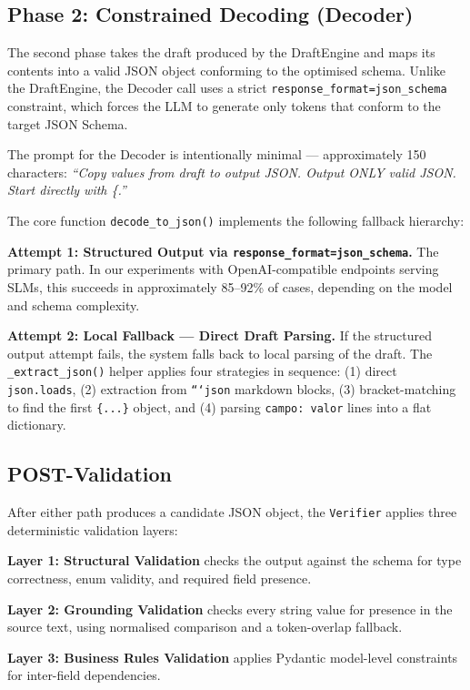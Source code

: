 \documentclass[onecolumn]{ceurart}
\begin{document}
\subsection{Phase 2: Constrained Decoding (Decoder)}

The second phase takes the draft produced by the DraftEngine and maps its
contents into a valid JSON object conforming to the optimised schema. Unlike the
DraftEngine, the Decoder call uses a strict
\texttt{response\_format=json\_schema} constraint, which forces the LLM to
generate only tokens that conform to the target JSON Schema.

The prompt for the Decoder is intentionally minimal --- approximately 150
characters: \emph{``Copy values from draft to output JSON. Output ONLY valid
JSON. Start directly with \{.''}

The core function \texttt{decode\_to\_json()} implements the following fallback
hierarchy:

\textbf{Attempt 1: Structured Output via
\texttt{response\_format=json\_schema}.} The primary path. In our experiments
with OpenAI-compatible endpoints serving SLMs, this succeeds in approximately
85--92\% of cases, depending on the model and schema complexity.

\textbf{Attempt 2: Local Fallback --- Direct Draft Parsing.} If the structured
output attempt fails, the system falls back to local parsing of the draft. The
\texttt{\_extract\_json()} helper applies four strategies in sequence:
(1) direct \texttt{json.loads}, (2) extraction from \texttt{```json} markdown
blocks, (3) bracket-matching to find the first \texttt{\{...\}} object, and
(4) parsing \texttt{campo: valor} lines into a flat dictionary.

\subsection{POST-Validation}

After either path produces a candidate JSON object, the \texttt{Verifier}
applies three deterministic validation layers:

\textbf{Layer 1: Structural Validation} checks the output against the schema for
type correctness, enum validity, and required field presence.

\textbf{Layer 2: Grounding Validation} checks every string value for presence in
the source text, using normalised comparison and a token-overlap fallback.

\textbf{Layer 3: Business Rules Validation} applies Pydantic model-level
constraints for inter-field dependencies.
\end{document}
